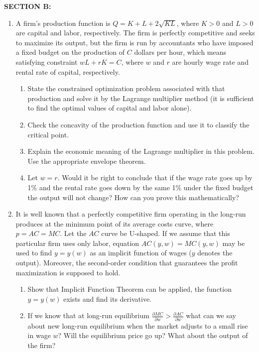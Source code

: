 \documentclass[12pt]{article} %
\theoremstyle{definition} %
\begin{document}
\textbf{SECTION B:}
\begin{enumerate}
\item A firm’s production function is $Q=K+L+2\sqrt{KL}$, where $K>0$ and $L>0$ are capital and labor, respectively. The firm is perfectly competitive and seeks to maximize its output, but the firm is run by accountants who have imposed a fixed budget on the production of $C$ dollars per hour, which means satisfying constraint $wL+rK=C$, where $w$ and $r$ are hourly wage rate and rental rate of capital, respectively.
\begin{enumerate}
\item State the constrained optimization problem associated with that production and solve it by the Lagrange multiplier method (it is sufficient to find the optimal values of capital and labor alone).
\item Check the concavity of the production function and use it to classify the critical point.
\item Explain the economic meaning of the Lagrange multiplier in this problem. Use the appropriate envelope theorem.
\item Let $w=r$. Would it be right to conclude that if the wage rate goes up by 1\% and the rental rate goes down by the same 1\% under the fixed budget the output will not change?  How can you prove this mathematically?
\end{enumerate}

\item It is well known that a perfectly competitive firm operating in the long-run produces at the minimum point of its average costs curve, where $p=AC=MC$. Let the $AC$ curve be U-shaped. If we assume that this particular firm uses only labor, equation $AC(y,w)=MC(y,w)$ may be used to find $y=y(w)$  as an implicit function of wages ($y$ denotes the output). Moreover, the second-order condition that guarantees the profit maximization is supposed to hold.
\begin{enumerate}
\item Show that Implicit Function Theorem can be applied, the function $y=y(w)$ exists and find its derivative.
\item If we know that at long-run equilibrium $\frac{\partial MC}{\partial w}>\frac{\partial AC}{\partial w}$  what can we say about new long-run equilibrium when the market adjusts to a small rise in wage $w$? Will the equilibrium price go up? What about the output of the firm?
\end{enumerate}
\end{enumerate}
\end{document}
